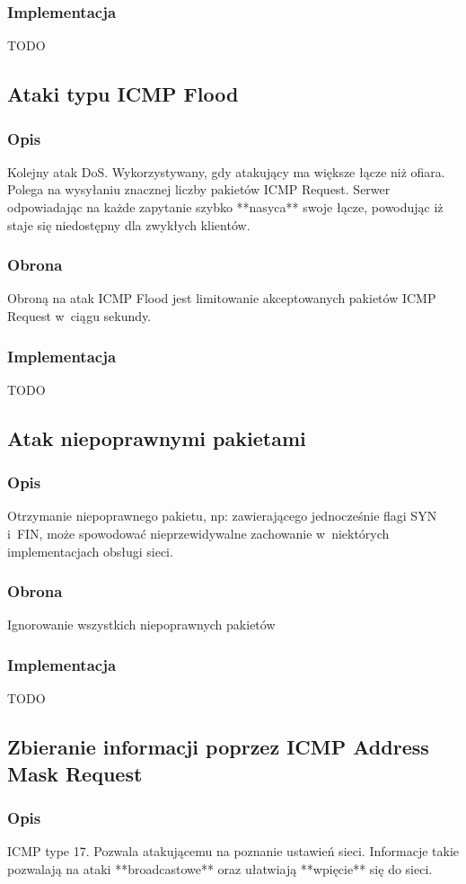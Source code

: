 \documentclass[a4paper,10pt]{article}
\begin{document}
		\subsubsection{Implementacja}
			TODO
	\subsection{Ataki typu ICMP Flood}
		\subsubsection{Opis}
			Kolejny atak DoS. Wykorzystywany, gdy atakujący ma większe łącze niż ofiara. Polega na wysyłaniu znacznej liczby pakietów ICMP Request. Serwer odpowiadając na każde zapytanie szybko **nasyca** swoje łącze, powodując iż staje się niedostępny dla zwykłych klientów.
		\subsubsection{Obrona}
			Obroną na atak ICMP Flood jest limitowanie akceptowanych pakietów ICMP Request w~ciągu sekundy.
		\subsubsection{Implementacja}
			TODO
	\subsection{Atak niepoprawnymi pakietami}
		\subsubsection{Opis}
			Otrzymanie niepoprawnego pakietu, np: zawierającego jednocześnie flagi SYN i~FIN, może spowodować nieprzewidywalne zachowanie w~niektórych implementacjach obsługi sieci.
		\subsubsection{Obrona}
			Ignorowanie wszystkich niepoprawnych pakietów
		\subsubsection{Implementacja}
			TODO
	\subsection{Zbieranie informacji poprzez ICMP Address Mask Request}
		\subsubsection{Opis}
			ICMP type 17. Pozwala atakującemu na poznanie ustawień sieci. Informacje takie pozwalają na ataki **broadcastowe** oraz ułatwiają **wpięcie** się do sieci.\\
\end{document}
